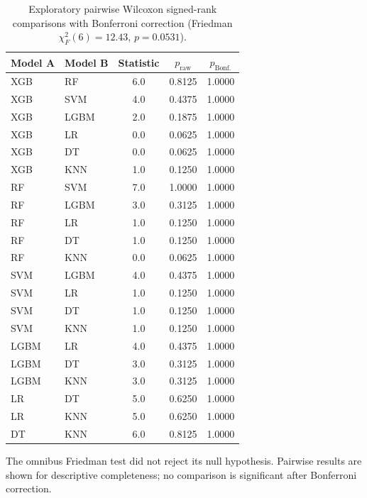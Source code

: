\begin{table}[htbp]
  \centering
  \caption{Exploratory pairwise Wilcoxon signed-rank comparisons with Bonferroni correction (Friedman $\chi^2_F(6) = 12.43$, $p = 0.0531$).}
  \label{tab:step7_pairwise}
  \small
  \begin{tabular}{llccc}
    \toprule
    Model A & Model B & Statistic & $p_\text{raw}$ & $p_\text{Bonf.}$ \\
    \midrule
    XGB & RF & 6.0 & 0.8125 & 1.0000 \\
    XGB & SVM & 4.0 & 0.4375 & 1.0000 \\
    XGB & LGBM & 2.0 & 0.1875 & 1.0000 \\
    XGB & LR & 0.0 & 0.0625 & 1.0000 \\
    XGB & DT & 0.0 & 0.0625 & 1.0000 \\
    XGB & KNN & 1.0 & 0.1250 & 1.0000 \\
    RF & SVM & 7.0 & 1.0000 & 1.0000 \\
    RF & LGBM & 3.0 & 0.3125 & 1.0000 \\
    RF & LR & 1.0 & 0.1250 & 1.0000 \\
    RF & DT & 1.0 & 0.1250 & 1.0000 \\
    RF & KNN & 0.0 & 0.0625 & 1.0000 \\
    SVM & LGBM & 4.0 & 0.4375 & 1.0000 \\
    SVM & LR & 1.0 & 0.1250 & 1.0000 \\
    SVM & DT & 1.0 & 0.1250 & 1.0000 \\
    SVM & KNN & 1.0 & 0.1250 & 1.0000 \\
    LGBM & LR & 4.0 & 0.4375 & 1.0000 \\
    LGBM & DT & 3.0 & 0.3125 & 1.0000 \\
    LGBM & KNN & 3.0 & 0.3125 & 1.0000 \\
    LR & DT & 5.0 & 0.6250 & 1.0000 \\
    LR & KNN & 5.0 & 0.6250 & 1.0000 \\
    DT & KNN & 6.0 & 0.8125 & 1.0000 \\
    \bottomrule
  \end{tabular}
  \vspace{2pt}
  \begin{flushleft}
    \footnotesize The omnibus Friedman test did not reject its null hypothesis. Pairwise results are shown for descriptive completeness; no comparison is significant after Bonferroni correction.
  \end{flushleft}
\end{table}
